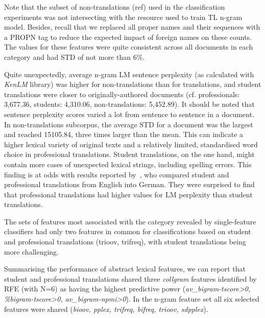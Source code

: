 Note that the subset of non-translations (ref) used in the classification experiments was not intersecting with the resource used to train TL n-gram model. Besides, recall that we replaced all proper names and their sequences with a PROPN tag to reduce the expected impact of foreign names on these counts.
The values for these features were quite consistent across all documents in each category and had STD of not more than 6\%.

%
\label{pg:stu_more_surprising_than_pro}
Quite unexpectedly, average n-gram LM sentence perplexity (as calculated with \textit{KenLM} library) was higher for non-translations than for translations, and student translations were closer to originally-authored documents (cf. professionals: 3,677.36, students: 4,310.06, non-translations: 5,452.89). It should be noted that sentence perplexity scores varied a lot from sentence to sentence in a document. In non-translations subcorpus, the average STD for a document was the largest and reached 15105.84, three times larger than the mean.
This can indicate a higher lexical variety of original texts and a relatively limited, standardised word choice in professional translations. Student translations, on the one hand, might contain more cases of unexpected lexical strings, including spelling errors. 
This finding is at odds with results reported by~\cite{Bizzoni2021}, who compared student and professional translations from English into German. They were surprised to find that professional translations had higher values for LM perplexity than student translations.

The sets of features most associated with the category revealed by single-feature classifiers had only two features in common for classifications based on student and professional translations (trioov, trifreq), with student translations being more challenging.

Summarising the performance of abstract lexical features, we can report that student and professional translations shared three \textit{collgram} features identified by RFE (with N=6) as having the highest predictive power (\textit{av\_bigram-tscore>0, \%bigram-tscore>0, av\_bigram-npmi>0}). In the n-gram feature set all six selected features were shared (\textit{bioov, pplex, trifreq, bifreq, trioov, sdpplex}). 

